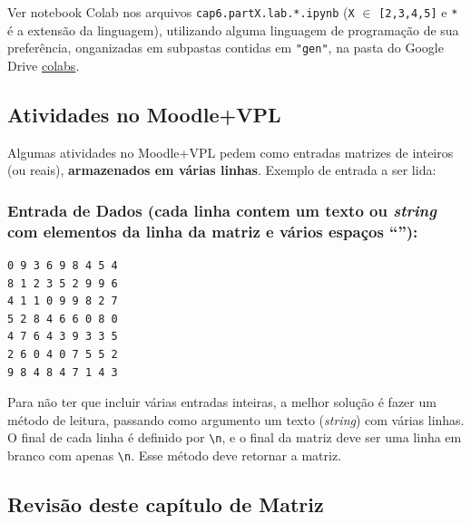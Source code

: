 \documentclass[12pt,a4paper]{article}
\begin{document}
    Ver notebook Colab nos arquivos \texttt{cap6.partX.lab.*.ipynb}
(\texttt{X} \(\in\) \texttt{{[}2,3,4,5{]}} e \texttt{*} é a extensão da
linguagem), utilizando alguma linguagem de programação de sua
preferência, onganizadas em subpastas contidas em \texttt{"gen"}, na
pasta do Google Drive
\href{https://drive.google.com/drive/folders/1YlFwv8XYN7PYYf-HwDMlkxzbmXzJw9cM?usp=sharing}{colabs}.

    \hypertarget{atividades-no-moodlevpl}{%
\subsection{Atividades no Moodle+VPL}\label{atividades-no-moodlevpl}}

Algumas atividades no Moodle+VPL pedem como entradas matrizes de
inteiros (ou reais), \textbf{armazenados em várias linhas}. Exemplo de
entrada a ser lida:

\hypertarget{entrada-de-dados-cada-linha-contem-um-texto-ou-string-com-elementos-da-linha-da-matriz-e-vuxe1rios-espauxe7os}{%
\subsubsection{\texorpdfstring{Entrada de Dados (cada linha contem um
texto ou \emph{string} com elementos da linha da matriz e vários espaços
``\texttt{}''):}{Entrada de Dados (cada linha contem um texto ou string com elementos da linha da matriz e vários espaços ``''):}}\label{entrada-de-dados-cada-linha-contem-um-texto-ou-string-com-elementos-da-linha-da-matriz-e-vuxe1rios-espauxe7os}}

\begin{verbatim}
0 9 3 6 9 8 4 5 4
8 1 2 3 5 2 9 9 6
4 1 1 0 9 9 8 2 7
5 2 8 4 6 6 0 8 0
4 7 6 4 3 9 3 3 5
2 6 0 4 0 7 5 5 2
9 8 4 8 4 7 1 4 3
\end{verbatim}

Para não ter que incluir várias entradas inteiras, a melhor solução é
fazer um método de leitura, passando como argumento um texto
(\emph{string}) com várias linhas. O final de cada linha é definido por
\texttt{\textbackslash{}n}, e o final da matriz deve ser uma linha em
branco com apenas \texttt{\textbackslash{}n}. Esse método deve retornar
a matriz.

    \hypertarget{revisuxe3o-deste-capuxedtulo-de-matriz}{%
\subsection{Revisão deste capítulo de
Matriz}\label{revisuxe3o-deste-capuxedtulo-de-matriz}}
\end{document}
